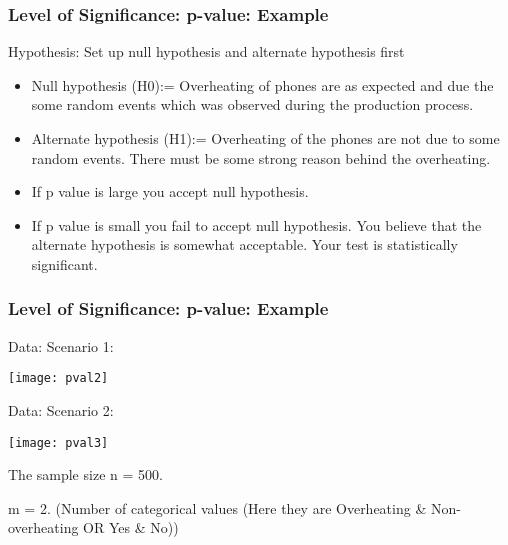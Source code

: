 \begin{frame}[fragile]\frametitle{Level of Significance: p-value: Example}
Hypothesis: Set up null hypothesis and alternate hypothesis first
\begin{itemize}
\item Null hypothesis (H0):= Overheating of phones are as expected and due the some random events which was observed during the production process.
\item Alternate hypothesis (H1):= Overheating of the phones are not due to some random events. There must be some strong reason behind the overheating.
\item If p value is large you accept null hypothesis.
\item If p value is small you fail to accept null hypothesis. You believe that the alternate hypothesis is somewhat acceptable. Your test is statistically significant.
\end{itemize}



\end{frame}

\begin{frame}[fragile]\frametitle{Level of Significance: p-value: Example}
Data: Scenario 1:
\begin{center}
\texttt{[image: pval2]}
\end{center}

Data: Scenario 2:
\begin{center}
\texttt{[image: pval3]}
\end{center}

The sample size n = 500.

m = 2. (Number of categorical values (Here they are Overheating \& Non-overheating OR Yes \& No))


\end{frame}


